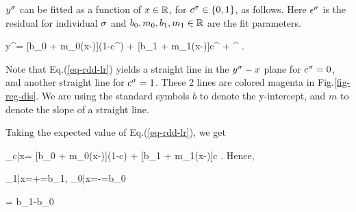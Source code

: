 $y^\sigma$
can be fitted
as a function of $x\in { \mathbb{R}}$,
for $c^\sigma \in \{0,1\}$,
 as follows.
Here $\epsilon^\sigma$
is the residual
for individual $\sigma$
and $b_0, m_0, b_1, m_1\in { \mathbb{R}}$
are the fit parameters.

\beq
y^\s = [b_0 + m_0(x-\xi)](1-c^\s)
+  [b_1 + m_1(x-\xi)]c^\s
+ \eps^\s
\;.
\label{eq-rdd-lr}
\eeq

Note that Eq.(\ref{eq-rdd-lr})
 yields a straight line
in the $y^\sigma-x$ plane
for $c^\sigma=0$,
and another 
straight line for $c^\sigma=1$.
These 2 lines are 
colored magenta in Fig.\ref{fig-reg-dis}.
We are
using the
standard symbols
$b$ to denote
the y-intercept, and $m$ 
to denote the slope
of a straight line.

Taking the expected value
of Eq.(\ref{eq-rdd-lr}), we get

\beq
\caly_{c|x}=
[b_0 + m_0(x-\xi)](1-c)
+  [b_1 + m_1(x-\xi)]c
\;.
\eeq
Hence,

\beq
\caly_{1|x=\xi+}=b_1\;,\;\;
\caly_{0|x=\xi-}=b_0
\eeq

\beq
\delta= b_1-b_0
\eeq

